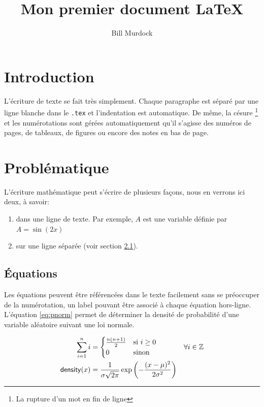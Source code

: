 \documentclass[12pt]{article} %
\author{Bill Murdock}
\title{Mon premier document \LaTeX}
\begin{document}
\maketitle

\tableofcontents
\newpage

\section{Introduction}
L'écriture de texte se fait très simplement. Chaque paragraphe est séparé par une ligne blanche dans le \verb|.tex| et l'indentation est automatique. De même, la césure \footnote{La rupture d'un mot en fin de ligne} et les numérotations sont gérées automatiquement qu'il s'agisse des numéros de pages, de tableaux, de figures ou encore des notes en bas de page.

\section{Problématique}

L'écriture mathématique peut s'écrire de plusieurs façons, nous en verrons ici deux, à savoir:
\begin{enumerate}
 	\item dans une ligne de texte.
      Par exemple, $A$ est une variable définie par $A=\sin(2x)$
 	\item sur une ligne séparée (voir section \ref{eq}).
 \end{enumerate}

\subsection{Équations}\label{eq}

Les équations peuvent être référencées dans le texte facilement sans se préoccuper de la numérotation, un label pouvant être associé à chaque équation hors-ligne.
L'équation \eqref{eq:pnorm} permet de déterminer la densité de probabilité d'une variable aléatoire suivant une loi normale.

\begin{align}
  \notag
  \sum_{i=1}^n i & =
  \begin{cases}
    \frac{n (n+1)}{2} & \text{si } i \geq 0\\
    0 & \text{sinon}
  \end{cases} & \forall i \in \mathbb{Z}\\
  \label{eq:pnorm}
  \mathsf{density}(x) & = \frac{1}{\sigma \sqrt{2\pi}} \exp \left(-\frac{(x-\mu)^2}{2\sigma^2}\right)
\end{align}
\end{document}
